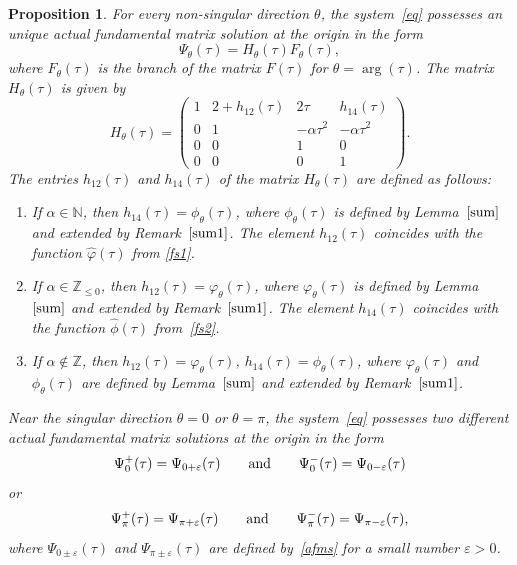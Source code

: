 \documentclass[pdftex]{sigma}
\numberwithin{equation}{section}
\newtheorem{Proposition}[Theorem]{Proposition}
 { \theoremstyle{definition}
\newtheorem{Definition}[Theorem]{Definition}
\newtheorem{Note}[Theorem]{Note}
\newtheorem{Example}[Theorem]{Example}
\newtheorem{Remark}[Theorem]{Remark} }
\begin{document}
 \begin{Proposition}\label{ac}
 For every non-singular direction $\theta$, the system~\eqref{eq} possesses an unique actual fundamental matrix solution
 at the origin in the form
 \begin{equation}
 \Psi_{\theta}(\tau)=H_{\theta}(\tau) F_{\theta}(\tau) ,\label{afms}
 \end{equation}
 where $F_{\theta}(\tau)$ is the branch of the matrix $F(\tau)$ for $\theta=\arg (\tau)$. The matrix $H_{\theta}(\tau)$
 is given by
 \[
 H_{\theta}(\tau)=\begin{pmatrix}
 1 & 2 + h_{12}(\tau) & 2 \tau & h_{14}(\tau)\\
 0 & 1 & -\alpha \tau^2 & -\alpha \tau^2\\
 0 & 0 & 1 & 0\\
 0 & 0 & 0 & 1
 \end{pmatrix} .
 \]
 The entries $h_{12}(\tau)$ and $h_{14}(\tau)$ of the matrix $H_{\theta}(\tau)$ are defined as follows:
 \begin{enumerate}
 	\itemsep=0pt
 \item[$1.$]
 If $\alpha\in\mathbb{N}$, then $h_{14}(\tau)=\phi_{\theta}(\tau)$, where $\phi_{\theta}(\tau)$ is defined by Lemma~$\ref{sum}$
 and extended by Remark~$\ref{sum1}$. The element $h_{12}(\tau)$ coincides with the function $\hat{\varphi}(\tau)$ from
 \eqref{fs1}.

 \item[$2.$]
 If $\alpha\in\mathbb{Z}_{\leq 0}$, then $h_{12}(\tau)=\varphi_{\theta}(\tau)$, where $\varphi_{\theta}(\tau)$ is defined
 by Lemma~$\ref{sum}$ and extended by Remark~$\ref{sum1}$. The element $h_{14}(\tau)$ coincides with the function $\hat{\phi}(\tau)$
 from~\eqref{fs2}.

 \item[$3.$]
 If $\alpha\notin\mathbb{Z}$, then $h_{12}(\tau)=\varphi_{\theta}(\tau)$, $h_{14}(\tau)=\phi_{\theta}(\tau)$,
 where $\varphi_{\theta}(\tau)$ and $\phi_{\theta}(\tau)$ are defined by Lemma~$\ref{sum}$ and extended by Remark~$\ref{sum1}$.
\end{enumerate}
 	
 Near the singular direction $\theta=0$ or $\theta=\pi$, the system~\eqref{eq} possesses two different actual
 fundamental matrix solutions at the origin in the form
 \[
 \Psi_{0}^+(\tau)=\Psi_{0+\varepsilon}(\tau) \qquad {\rm and} \qquad \Psi_0^{-}(\tau)=\Psi_{0-\varepsilon}(\tau)
 \] 	
 or
 \[
 \Psi_{\pi}^+(\tau)=\Psi_{\pi+\varepsilon}(\tau) \qquad {\rm and} \qquad \Psi_{\pi}^{-}(\tau)=\Psi_{\pi-\varepsilon}(\tau),
 \] 	
 where $\Psi_{0\pm \varepsilon}(\tau)$ and $\Psi_{\pi \pm \varepsilon}(\tau)$ are defined by~\eqref{afms} for a small number
 $\varepsilon > 0$.
 \end{Proposition}
\end{document}
